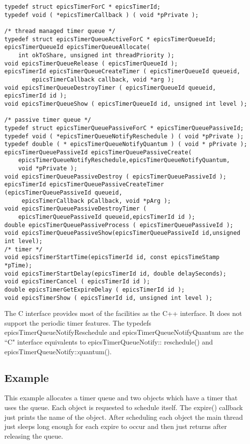 \begin{verbatim}
typedef struct epicsTimerForC * epicsTimerId;
typedef void ( *epicsTimerCallback ) ( void *pPrivate );

/* thread managed timer queue */
typedef struct epicsTimerQueueActiveForC * epicsTimerQueueId;
epicsTimerQueueId epicsTimerQueueAllocate(
    int okToShare, unsigned int threadPriority );
void epicsTimerQueueRelease ( epicsTimerQueueId );
epicsTimerId epicsTimerQueueCreateTimer ( epicsTimerQueueId queueid,
        epicsTimerCallback callback, void *arg );
void epicsTimerQueueDestroyTimer ( epicsTimerQueueId queueid, epicsTimerId id );
void epicsTimerQueueShow ( epicsTimerQueueId id, unsigned int level );

/* passive timer queue */
typedef struct epicsTimerQueuePassiveForC * epicsTimerQueuePassiveId;
typedef void ( *epicsTimerQueueNotifyReschedule ) ( void *pPrivate );
typedef double ( * epicsTimerQueueNotifyQuantum ) ( void * pPrivate );
epicsTimerQueuePassiveId epicsTimerQueuePassiveCreate(
    epicsTimerQueueNotifyReschedule,epicsTimerQueueNotifyQuantum,
    void *pPrivate );
void epicsTimerQueuePassiveDestroy ( epicsTimerQueuePassiveId );
epicsTimerId epicsTimerQueuePassiveCreateTimer (epicsTimerQueuePassiveId queueid,
     epicsTimerCallback pCallback, void *pArg );
void epicsTimerQueuePassiveDestroyTimer (
    epicsTimerQueuePassiveId queueid,epicsTimerId id );
double epicsTimerQueuePassiveProcess ( epicsTimerQueuePassiveId );
void epicsTimerQueuePassiveShow(epicsTimerQueuePassiveId id,unsigned int level);
/* timer */
void epicsTimerStartTime(epicsTimerId id, const epicsTimeStamp *pTime);
void epicsTimerStartDelay(epicsTimerId id, double delaySeconds);
void epicsTimerCancel ( epicsTimerId id );
double epicsTimerGetExpireDelay ( epicsTimerId id );
void epicsTimerShow ( epicsTimerId id, unsigned int level );
\end{verbatim}

The C interface provides most of the facilities as the C++ interface. It does not support the periodic timer features. The 
typedefs epicsTimerQueueNotifyReschedule and epicsTimerQueueNotifyQuantum are the ``C" interface equivalents to 
epicsTimerQueueNotify:: reschedule() and epicsTimerQueueNotify::quantum().

\subsection{Example}

This example allocates a timer queue and two objects which have a timer that uses the queue. Each object is requested to 
schedule itself. The expire() callback just prints the name of the object. After scheduling each object the main thread just 
sleeps long enough for each expire to occur and then just returns after releasing the queue.

